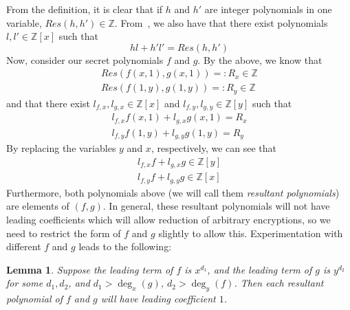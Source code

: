 \documentclass[11pt]{report}
\newtheorem{lemma}{Lemma}
\newcommand{\Z}{\mathbb{Z}}
\newcommand{\Zx}{\mathbb{Z}[x]}
\newcommand{\Zy}{\mathbb{Z}[y]}
\begin{document}
From the definition, it is clear that if $h$ and $h'$ are integer polynomials in one variable, $Res(h,h') \in \Z$. From~\cite{lang-algebra}, we also have that there exist polynomials $l,l'\in \Zx$ such that
\[hl+h'l' = Res(h,h') \]
Now, consider our secret polynomials $f$ and $g$. By the above, we know that
\begin{align*}
Res(f(x,1),g(x,1)) =: R_x \in \Z\\
Res(f(1,y),g(1,y)) =: R_y \in \Z
\end{align*}
and that there exist $l_{f,x}, l_{g,x}\in \Zx$ and $l_{f,y}, l_{g,y}\in \Zy$ such that
\begin{align*}
l_{f,x}f(x,1)+l_{g,x}g(x,1) = R_x\\
l_{f,y}f(1,y)+l_{g,y}g(1,y) = R_y
\end{align*}
By replacing the variables $y$ and $x$, respectively, we can see that
\begin{align*}
l_{f,x}f+l_{g,x}g \in \Zy\\
l_{f,y}f+l_{g,y}g \in \Zx
\end{align*}
Furthermore, both polynomials above (we will call them \emph{resultant polynomials}) are elements of $(f,g)$. In general, these resultant polynomials will not have leading coefficients which will allow reduction of arbitrary encryptions, so we need to restrict the form of $f$ and $g$ slightly to allow this. Experimentation with different $f$ and $g$ leads to the following:

\begin{lemma}
Suppose the leading term of $f$ is $x^{d_1}$, and the leading term of $g$ is $y^{d_2}$ for some $d_1, d_2$, and $d_1>\deg_x(g)$, $d_2 >\deg_y(f)$. Then each resultant polynomial of $f$ and $g$ will have leading coefficient $1$.
\end{lemma}
\end{document}
